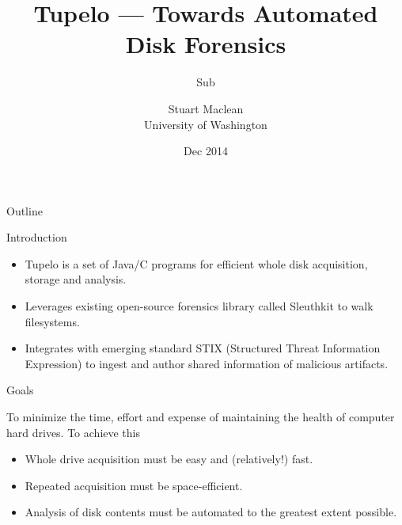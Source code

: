 \documentclass{beamer}
\title[Tupelo] %
{Tupelo --- Towards Automated Disk Forensics}
\subtitle
{Sub} %
\author[] %
{Stuart Maclean \\
University of Washington}
\date[] %
{Dec 2014}
\begin{document}

\begin{frame}
  \titlepage
\end{frame}


\begin{frame}{Outline}
  \tableofcontents[pausesections]
\end{frame}


\begin{frame}{Introduction}

\begin{itemize}
\item Tupelo is a set of Java/C programs for efficient whole disk
  acquisition, storage and analysis.

\item Leverages existing open-source forensics library called
  Sleuthkit to walk filesystems.

\item Integrates with emerging standard STIX (Structured
  Threat Information Expression) to ingest and
  author shared information of malicious artifacts.

\end{itemize}

\end{frame}



\begin{frame}{Goals}

To minimize the time, effort and expense of maintaining the health of
computer hard drives.  To achieve this

\begin{itemize}

\item Whole drive acquisition must be easy and (relatively!) fast.

\item Repeated acquisition must be space-efficient.

\item Analysis of disk contents must be automated to the greatest
  extent possible.

\end{itemize}


\end{frame}
\end{document}
